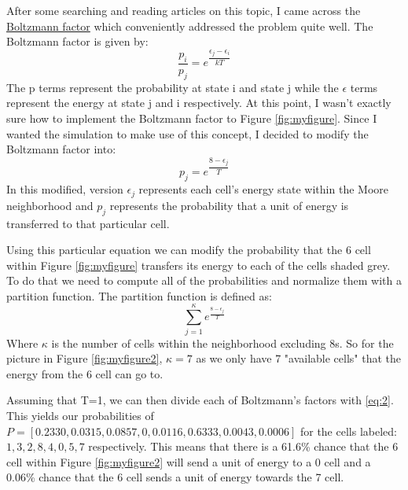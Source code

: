 \vspace{0.3cm}
\noindent
After some searching and reading articles on this topic, I came across the \href{https://en.wikipedia.org/wiki/Boltzmann_distribution}{Boltzmann factor} which conveniently addressed the problem quite well. The Boltzmann factor is given by: 
\vspace{0.2cm}
\begin{equation}
    \frac{p_{i}}{p_{j}}=e^{\dfrac{\epsilon_{j}-\epsilon_{i}}{kT}}
    \label{modboltz}
\end{equation}
The p terms represent the probability at state i and state j while the $\epsilon$ terms represent the energy at state j and i respectively. At this point, I wasn't exactly sure how to implement the Boltzmann factor to Figure \ref{fig:myfigure}. Since I wanted the simulation to make use of this concept, I decided to modify the Boltzmann factor into: 
\vspace{0.2cm}
\begin{equation}
    p_{j}=e^{\dfrac{8-\epsilon_{j}}{T}}
    \label{eq1}
\end{equation}
In this modified, version $\epsilon_{j}$ represents each cell's energy state within the Moore neighborhood and $p_{j}$ represents the probability that a unit of energy is transferred to that particular cell. \par

\vspace{0.3cm}
\noindent
Using this particular equation we can modify the probability that the 6 cell within Figure \ref{fig:myfigure} transfers its energy to each of the cells shaded grey. To do that we need to compute all of the probabilities and normalize them with a partition function. The partition function is defined as: 
\begin{equation}
    \sum_{j=1}^{\kappa} e^{\frac{8-\epsilon_{j}}{T}}
    \label{eq:2}
\end{equation}
Where $\kappa$ is the number of cells within the neighborhood excluding 8s. So for the picture in Figure \ref{fig:myfigure2}, $\kappa=7$ as we only have 7 "available cells" that the energy from the 6 cell can go to. \par

\vspace{0.3cm}
\noindent
Assuming that T=1, we can then divide each of Boltzmann's factors with \ref{eq:2}. This yields our probabilities of $P=[0.2330, 0.0315,0.0857, 0, 0.0116, 0.6333, 0.0043, 0.0006]$ for the cells labeled: $1, 3, 2, 8, 4, 0, 5, 7$ respectively. This means that there is a 61.6\% chance that the 6 cell within Figure \ref{fig:myfigure2} will send a unit of energy to a 0 cell and a 0.06\% chance that the 6 cell sends a unit of energy towards the 7 cell. \par

